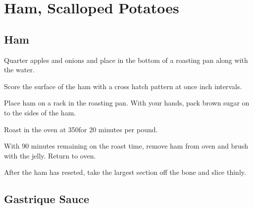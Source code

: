 
\section{Ham, Scalloped Potatoes}
\begin{recipe}


\subsection{Ham}



Quarter apples and onions and place in the bottom of a roasting pan along with the water.

Score the surface of the ham with a cross hatch pattern at once inch intervals.

Place ham on a rack in the roasting pan. With your hands, pack brown sugar on to the sides of the ham.

Roast in the oven at 350\degree for 20 minutes per pound.


With 90 minutes remaining on the roast time, remove ham from oven and brush with the jelly. Return to oven.

After the ham has reseted, take the largest section off the bone and slice thinly.

\subsection{Gastrique Sauce}



\end{recipe}
